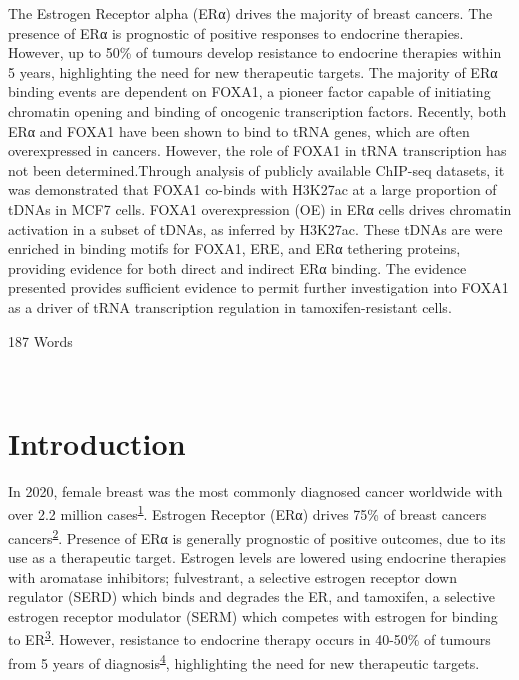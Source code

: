 \documentclass[
  12pt,
]{article}
\begin{document}
The Estrogen Receptor alpha (ERα) drives the majority of breast cancers. The presence of ERα is prognostic of positive responses to endocrine therapies. However, up to 50\% of tumours develop resistance to endocrine therapies within 5 years, highlighting the need for new therapeutic targets. The majority of ERα binding events are dependent on FOXA1, a pioneer factor capable of initiating chromatin opening and binding of oncogenic transcription factors. Recently, both ERα and FOXA1 have been shown to bind to tRNA genes, which are often overexpressed in cancers. However, the role of FOXA1 in tRNA transcription has not been determined.Through analysis of publicly available ChIP-seq datasets, it was demonstrated that FOXA1 co-binds with H3K27ac at a large proportion of tDNAs in MCF7 cells. FOXA1 overexpression (OE) in ERα cells drives chromatin activation in a subset of tDNAs, as inferred by H3K27ac. These tDNAs are were enriched in binding motifs for FOXA1, ERE, and ERα tethering proteins, providing evidence for both direct and indirect ERα binding. The evidence presented provides sufficient evidence to permit further investigation into FOXA1 as a driver of tRNA transcription regulation in tamoxifen-resistant cells.

\normalsize
\begin{flushright}
187 Words
\end{flushright}
\hrulefill\\
\setlength{\parindent}{10pt}

\hypertarget{introduction}{%
\section{Introduction}\label{introduction}}

In 2020, female breast was the most commonly diagnosed cancer worldwide with over 2.2 million cases\textsuperscript{\protect\hyperlink{ref-Sung2021}{1}}.
Estrogen Receptor (ERα) drives 75\% of breast cancers cancers\textsuperscript{\protect\hyperlink{ref-allred2004}{2}}.
Presence of ERα is generally prognostic of positive outcomes, due to its use as a therapeutic target.
Estrogen levels are lowered using endocrine therapies with aromatase inhibitors; fulvestrant, a selective estrogen receptor down regulator (SERD) which binds and degrades the ER, and tamoxifen, a selective estrogen receptor modulator (SERM) which competes with estrogen for binding to ER\textsuperscript{\protect\hyperlink{ref-Johnston2018}{3}}.
However, resistance to endocrine therapy occurs in 40-50\% of tumours from 5 years of diagnosis\textsuperscript{\protect\hyperlink{ref-Anurag2018}{4}}, highlighting the need for new therapeutic targets.
\end{document}
